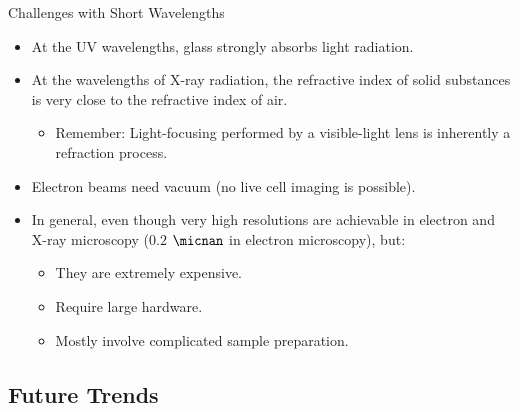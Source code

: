 \begin{frame}[c]{Challenges with Short Wavelengths}
	\begin{itemize}
		\setlength\itemsep{0.4cm}
		\item<1-> At the UV wavelengths, glass strongly absorbs light radiation.
		\item<2-> At the wavelengths of X-ray radiation, the refractive index of solid substances is very close to the refractive index of air.

		      \begin{itemize}
			      \item<3-> Remember: Light-focusing performed by a visible-light lens is inherently a refraction process.
		      \end{itemize}
		\item<4-> Electron beams need vacuum (no live cell imaging is possible).
		\item<5-> In general, even though very high resolutions are achievable in electron and X-ray microscopy ($0.2$ $\micnan$ in electron microscopy), but:
		      \begin{itemize}
			      \item<5-> They are extremely expensive.
			      \item<6-> Require large hardware.
			      \item<7-> Mostly involve complicated sample preparation.
		      \end{itemize}
	\end{itemize}

\end{frame}

\subsection{Future Trends}%
\label{sub:future_trends}



